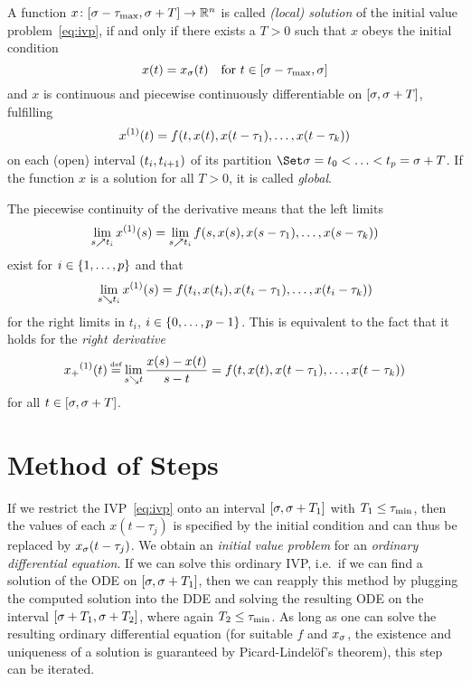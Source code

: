     \begin{definition}\label{def:solution-dde}
        A function $x\colon[\sigma-\tau_{\max},\sigma+T]\to\mathbb{R}^n$ is called \emph{(local) solution} of the initial value problem~\eqref{eq:ivp}, if and only if there exists a $T>0$ such that
        $x$ obeys the initial condition
        \begin{equation*}
            x(t) = x_{\sigma}(t) \quad\text{for } t\in[\sigma-\tau_{\max},\sigma]
        \end{equation*}
        and $x$ is continuous and piecewise continuously differentiable on $[\sigma,\sigma+T]$, fulfilling
        \begin{equation*}
            \D{x}(t) = f(t,x(t),x(t-\tau_1),\ldots,x(t-\tau_k))
        \end{equation*}
        on each (open) interval $(t_i,t_{i+1})$ of its partition $\partition{\tzero=t_0}{t_p=\tzero+T}$.
        If the function $x$ is a solution for all $T>0$, it is called \emph{global}.   
    \end{definition}
    
    The piecewise continuity of the derivative means that the left limits
    \begin{equation*}
        \lim_{s\upto t_i}\D{x}(s) = \lim_{s\upto t_i}f(s,x(s),x(s-\tau_1),\ldots,x(s-\tau_k))
    \end{equation*}
    exist for $i\in\left\{1,\ldots,p\right\}$ and that
    \begin{equation*}
        \lim_{s\downto t_i}\D{x}(s) = f(t_i,x(t_i),x(t_i-\tau_1),\ldots,x(t_i-\tau_k))
    \end{equation*}
    for the right limits in $t_i$, $i\in\left\{0,\ldots,p-1\right\}$.
    This is equivalent to the fact that it holds for the \emph{right derivative}
    \begin{equation*}
        \D{x_+}(t)\defeq
        \lim_{s\downto t}\frac{x(s)-x(t)}{s-t}
        = f(t,x(t),x(t-\tau_1),\ldots,x(t-\tau_k))
    \end{equation*}
    for all $t\in[\sigma,\sigma+T]$.


\section{Method of Steps}
    \label{sec:method-of-steps}
    
    If we restrict the IVP~\eqref{eq:ivp} onto an interval $[\sigma,\sigma+T_1]$ with $T_1\leq\tau_{\min}$, then the values of each $x(t-\tau_j)$ is specified by the initial condition and can thus be replaced by $x_{\sigma}(t-\tau_j)$.
    We obtain an \emph{initial value problem} for an \emph{ordinary differential equation}.
    If we can solve this ordinary IVP, i.e.\ if we can find a solution of the ODE on $[\sigma,\sigma+T_1]$, then we can reapply this method by plugging the computed solution into the DDE and solving the resulting ODE on the interval $[\sigma+T_1,\sigma+T_2]$, where again $T_2\leq\tau_{\min}$. As long as one can solve the resulting ordinary differential equation (for suitable $f$ and $x_{\sigma}$, the existence and uniqueness of a solution is guaranteed by Picard-Lindelöf's theorem), this step can be iterated.

